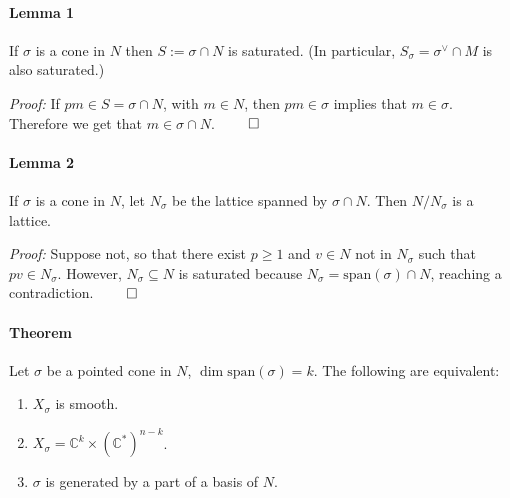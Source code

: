 \documentclass[a4paper,12pt]{amsart}
\newcommand{\CC}{\mathbb{C}}
\begin{document}
\paragraph{Lemma 1}
If $\sigma$ is a cone in $N$ then $S := \sigma \cap N$ is saturated. (In particular, $S_\sigma = \sigma^\vee \cap M$ is also saturated.)

\textit{Proof:}  If $pm \in S = \sigma \cap N$, with $m \in N$, then $pm \in \sigma$ implies that $m \in \sigma$. Therefore we get that $m \in \sigma \cap N$. $\qed$

\paragraph{Lemma 2}
If $\sigma$ is a cone in $N$, let $N_\sigma$ be the lattice spanned by $\sigma \cap N$. Then $N/N_\sigma$ is a lattice. 

\textit{Proof:} Suppose not, so that there exist $p \geq 1$ and $v \in N$ not in $N_\sigma$ such that $pv \in N_\sigma$. However, $N_\sigma \subseteq N$ is saturated because $N_\sigma = \text{span}(\sigma) \cap N$, reaching a contradiction. $\qed$

\paragraph{Theorem}
Let $\sigma$ be a pointed cone in $N$, $\dim \text{span}(\sigma) = k$. The following are equivalent:
\begin{enumerate}
	\item $X_\sigma$ is smooth.
	\item $X_\sigma = \CC^k \times (\CC^*)^{n-k}$.
	\item $\sigma$ is generated by a part of a basis of $N$.
\end{enumerate}
\end{document}
